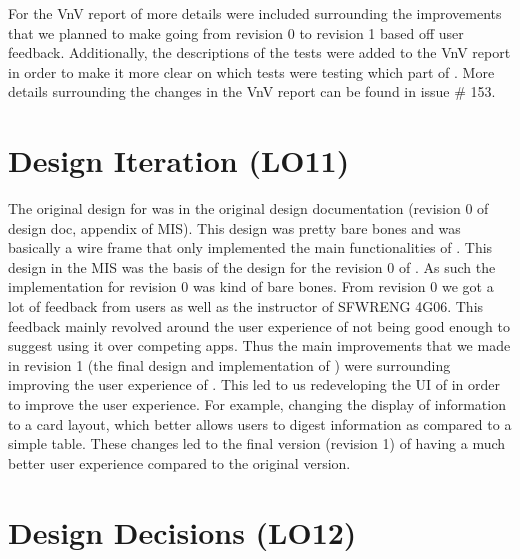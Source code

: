 \documentclass{article}
\begin{document}
For the VnV report of \progname{} more details were included surrounding the improvements that we planned to make going from revision 0 to revision 1 based off user feedback. Additionally, the descriptions of the tests were added to the VnV report in order to make it more clear on which tests were testing which part of \progname{}. More details surrounding the changes in the VnV report can be found in issue \# 153.

\section{Design Iteration (LO11)}
The original design for \progname{} was in the original design documentation (revision 0 of design doc, appendix of MIS). This design was pretty bare bones and was basically a wire frame that only implemented the main functionalities of \progname{}. This design in the MIS was the basis of the design for the revision 0 of \progname{}. As such the implementation for revision 0 was kind of bare bones. From revision 0 we got a lot of feedback from users as well as the instructor of SFWRENG 4G06. This feedback mainly revolved around the user experience of \progname{} not being good enough to suggest using it over competing apps. Thus the main improvements that we made in revision 1 (the final design and implementation of \progname{}) were surrounding improving the user experience of \progname{}. This led to us redeveloping the UI of \progname{} in order to improve the user experience. For example, changing the display of information to a card layout, which better allows users to digest information as compared to a simple table. These changes led to the final version (revision 1) of \progname{} having a much better user experience compared to the original version.



\section{Design Decisions (LO12)}
\end{document}
